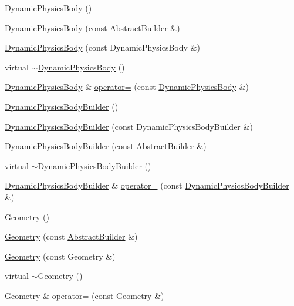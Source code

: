 \begin{DoxyCompactItemize}
\item 
\hyperlink{namespacejli_a3bc1a43f8a3bfe33e3874a74ebfde685}{Dynamic\+Physics\+Body} ()
\item 
\hyperlink{namespacejli_a624a3cdacc2bbdd8f5aa1bfa94d65e78}{Dynamic\+Physics\+Body} (const \hyperlink{classjli_1_1_abstract_builder}{Abstract\+Builder} \&)
\item 
\hyperlink{namespacejli_a3bdc7905c274142d7f2930b7632bb0bc}{Dynamic\+Physics\+Body} (const Dynamic\+Physics\+Body \&)
\item 
virtual \hyperlink{namespacejli_a69f8874be747ab0e2f52c063ff30cf8a}{$\sim$\+Dynamic\+Physics\+Body} ()
\item 
\hyperlink{namespacejli_a3bc1a43f8a3bfe33e3874a74ebfde685}{Dynamic\+Physics\+Body} \& \hyperlink{namespacejli_aebf62cef126edcd79bdabcfa87a74074}{operator=} (const \hyperlink{namespacejli_a3bc1a43f8a3bfe33e3874a74ebfde685}{Dynamic\+Physics\+Body} \&)
\item 
\hyperlink{namespacejli_a2f8ceeb7f6753810b5778f1f4e2ffcff}{Dynamic\+Physics\+Body\+Builder} ()
\item 
\hyperlink{namespacejli_a925718f179e05461f123aec7d49e2302}{Dynamic\+Physics\+Body\+Builder} (const Dynamic\+Physics\+Body\+Builder \&)
\item 
\hyperlink{namespacejli_a09d63a7b6aeebc6c1adc2d29cad4a436}{Dynamic\+Physics\+Body\+Builder} (const \hyperlink{classjli_1_1_abstract_builder}{Abstract\+Builder} \&)
\item 
virtual \hyperlink{namespacejli_a08c80dbab444bb2250f72c44561b3137}{$\sim$\+Dynamic\+Physics\+Body\+Builder} ()
\item 
\hyperlink{namespacejli_a2f8ceeb7f6753810b5778f1f4e2ffcff}{Dynamic\+Physics\+Body\+Builder} \& \hyperlink{namespacejli_ab8cc09c315dd5eeaa1e5db63da094b52}{operator=} (const \hyperlink{namespacejli_a2f8ceeb7f6753810b5778f1f4e2ffcff}{Dynamic\+Physics\+Body\+Builder} \&)
\item 
\hyperlink{namespacejli_ac063e70317c4eccadadf9d805956a87b}{Geometry} ()
\item 
\hyperlink{namespacejli_a552c53ee3e235bf331151d3790926346}{Geometry} (const \hyperlink{classjli_1_1_abstract_builder}{Abstract\+Builder} \&)
\item 
\hyperlink{namespacejli_a3f790419c37591e236dbbeb4b11527df}{Geometry} (const Geometry \&)
\item 
virtual \hyperlink{namespacejli_a9cc315b0120d6422b18074d035e375dd}{$\sim$\+Geometry} ()
\item 
\hyperlink{namespacejli_ac063e70317c4eccadadf9d805956a87b}{Geometry} \& \hyperlink{namespacejli_a35f6fd9cb84a92ee1a41e074d4ec09bf}{operator=} (const \hyperlink{namespacejli_ac063e70317c4eccadadf9d805956a87b}{Geometry} \&)

\end{DoxyCompactItemize}
